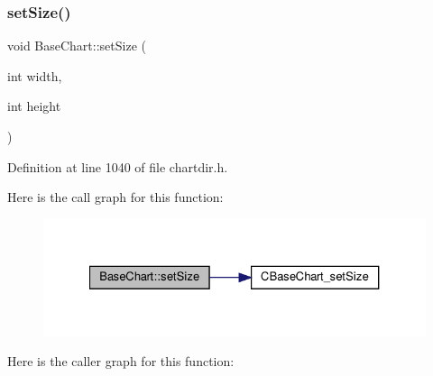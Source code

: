 \subsubsection{\texorpdfstring{set\+Size()}{setSize()}}
{\footnotesize\ttfamily void Base\+Chart\+::set\+Size (\begin{DoxyParamCaption}\item[{int}]{width,  }\item[{int}]{height }\end{DoxyParamCaption})\hspace{0.3cm}{\ttfamily [inline]}}



Definition at line 1040 of file chartdir.\+h.

Here is the call graph for this function\+:
\nopagebreak
\begin{figure}[H]
\begin{center}
\leavevmode
\includegraphics[width=327pt]{class_base_chart_a094bfc84860d6671e638ccd2c96bd364_cgraph}
\end{center}
\end{figure}
Here is the caller graph for this function\+:
\nopagebreak
